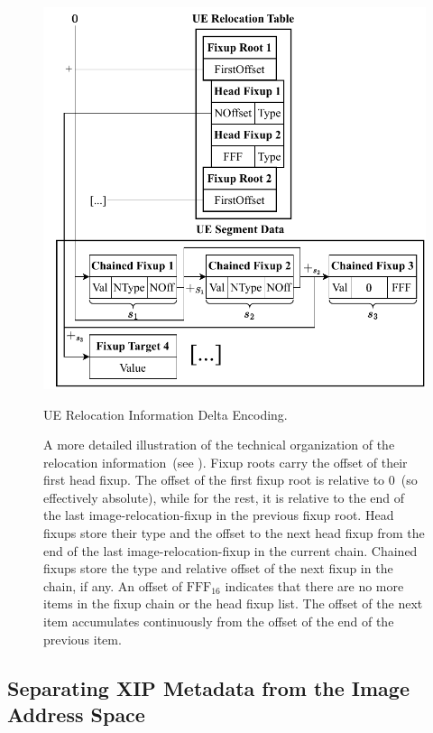 \begin{figure}[htbp]
  \centering
  \includegraphics{Figures/UeRelocDetails.pdf}
  \caption{UE Relocation Information Delta Encoding.}
  \label{fig:ue_reloc_enc}
  \caption*{A more detailed illustration of the technical organization of the  relocation information~(see ). Fixup roots carry the offset of their first head fixup. The offset of the first fixup root is relative to $0$~(so effectively absolute), while for the rest, it is relative to the end of the last \gls{image-relocation-fixup} in the previous fixup root. Head fixups store their type and the offset to the next head fixup from the end of the last \gls{image-relocation-fixup} in the current chain. Chained fixups store the type and relative offset of the next fixup in the chain, if any. An offset of $\mathrm{FFF}_{16}$ indicates that there are no more items in the fixup chain or the head fixup list. The offset of the next item accumulates continuously from the offset of the end of the previous item.}
\end{figure}

\subsection{Separating XIP Metadata from the Image Address Space}
\label{sec:ue_xip}

